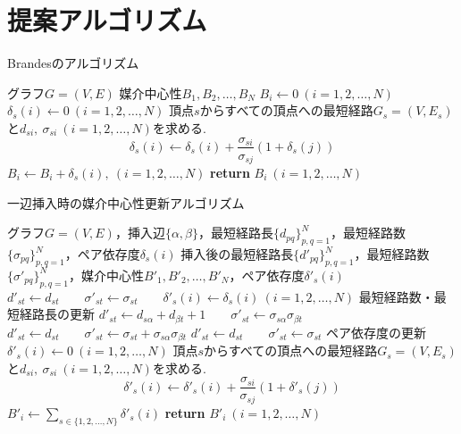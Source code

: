 \chapter{提案アルゴリズム}

\begin{algorithm}
  \caption{Brandesのアルゴリズム}
  \label{algo:brandes}
  \begin{algorithmic}[1]
    \Require グラフ$G=(V,E)$
    \Ensure 媒介中心性$B_1,B_2,\ldots,B_N$
    \State $B_i\gets0\ (i=1,2,\ldots,N)$
    \State $\delta_s(i)\gets0\ (i=1,2,\ldots,N)$
    \State 頂点$s$からすべての頂点への最短経路$G_s=(V,E_s)$と$d_{si},\ \sigma_{si}\ (i=1,2,\ldots,N)$を求める. 
    \State \begin{equation*} \delta_s(i)\gets\delta_s(i)+\frac{\sigma_{si}}{\sigma_{sj}}(1+\delta_s(j)) \end{equation*}
    \EndFor
    \State $B_i\gets B_i+\delta_s(i),\ (i=1,2,\ldots,N)$
    \EndFor
    \State \textbf{return} $B_i\ (i=1,2,\ldots,N)$
  \end{algorithmic}
\end{algorithm}

\begin{algorithm}
  \caption{一辺挿入時の媒介中心性更新アルゴリズム}
  \label{algo:insert}
  \begin{algorithmic}[1]
    \Require グラフ$G=(V,E)$，挿入辺$\{\alpha,\beta\}$，最短経路長$\{d_{pq}\}_{p,q=1}^N$，最短経路数$\{\sigma_{pq}\}_{p,q=1}^N$，ペア依存度$\delta_s(i)$
    \Ensure 挿入後の最短経路長$\{d'_{pq}\}_{p,q=1}^N$，最短経路数$\{\sigma'_{pq}\}_{p,q=1}^N$，媒介中心性$B'_1,B'_2,\ldots,B'_N$，ペア依存度$\delta'_s(i)$
    \State $d'_{st}\gets d_{st}\qquad\sigma'_{st}\gets\sigma_{st}\qquad\delta'_s(i)\gets\delta_s(i)\ (i=1,2,\ldots,N)$
    \Else
    \State\Comment 最短経路数・最短経路長の更新
    \State $d'_{st}\gets d_{s\alpha}+d_{\beta t}+1\qquad\sigma'_{st}\gets \sigma_{s\alpha}\sigma_{\beta t}$
    \State $d'_{st}\gets d_{st}\qquad\sigma'_{st}\gets \sigma_{st}+\sigma_{s\alpha}\sigma_{\beta t}$
    \State $d'_{st}\gets d_{st}\qquad\sigma'_{st}\gets\sigma_{st}$
    \EndIf
    \State\Comment ペア依存度の更新
    \State $\delta'_s(i)\gets0\ (i=1,2,\ldots,N)$
    \State 頂点$s$からすべての頂点への最短経路$G_s=(V,E_s)$と$d_{si},\ \sigma_{si}\ (i=1,2,\ldots,N)$を求める. 
    \State \begin{equation*} \delta'_s(i)\gets\delta'_s(i)+\frac{\sigma_{si}}{\sigma_{sj}}(1+\delta'_s(j)) \end{equation*}
    \EndFor
    \EndIf
    \EndFor
    \State $B'_i\gets\sum_{s\in\{1,2,\ldots,N\}}\delta'_s(i)$
    \State \textbf{return} $B'_i\ (i=1,2,\ldots,N)$
  \end{algorithmic}
\end{algorithm}

